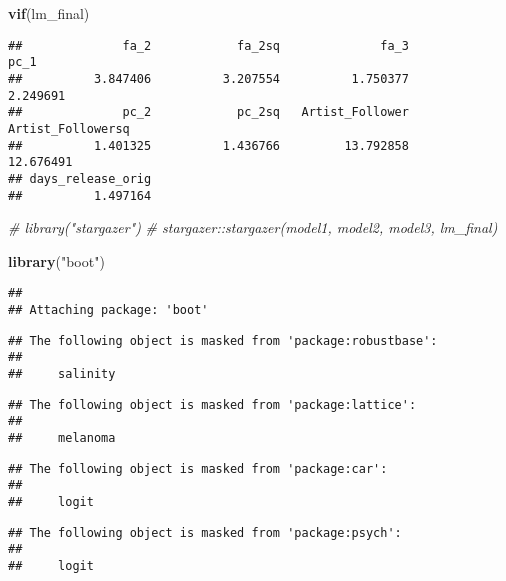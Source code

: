 \documentclass[
]{article}
\newenvironment{Shaded}{\begin{snugshade}}{\end{snugshade}}
\newcommand{\CommentTok}[1]{\textcolor[rgb]{0.56,0.35,0.01}{\textit{#1}}}
\newcommand{\KeywordTok}[1]{\textcolor[rgb]{0.13,0.29,0.53}{\textbf{#1}}}
\newcommand{\NormalTok}[1]{#1}
\newcommand{\StringTok}[1]{\textcolor[rgb]{0.31,0.60,0.02}{#1}}
\begin{document}
\begin{Shaded}
\begin{Highlighting}[]
\KeywordTok{vif}\NormalTok{(lm_final)}
\end{Highlighting}
\end{Shaded}

\begin{verbatim}
##              fa_2            fa_2sq              fa_3              pc_1 
##          3.847406          3.207554          1.750377          2.249691 
##              pc_2            pc_2sq   Artist_Follower Artist_Followersq 
##          1.401325          1.436766         13.792858         12.676491 
## days_release_orig 
##          1.497164
\end{verbatim}

\begin{Shaded}
\begin{Highlighting}[]
\CommentTok{# library("stargazer")}
\CommentTok{# stargazer::stargazer(model1, model2, model3, lm_final)}

\KeywordTok{library}\NormalTok{(}\StringTok{"boot"}\NormalTok{)}
\end{Highlighting}
\end{Shaded}

\begin{verbatim}
## 
## Attaching package: 'boot'
\end{verbatim}

\begin{verbatim}
## The following object is masked from 'package:robustbase':
## 
##     salinity
\end{verbatim}

\begin{verbatim}
## The following object is masked from 'package:lattice':
## 
##     melanoma
\end{verbatim}

\begin{verbatim}
## The following object is masked from 'package:car':
## 
##     logit
\end{verbatim}

\begin{verbatim}
## The following object is masked from 'package:psych':
## 
##     logit
\end{verbatim}
\end{document}
